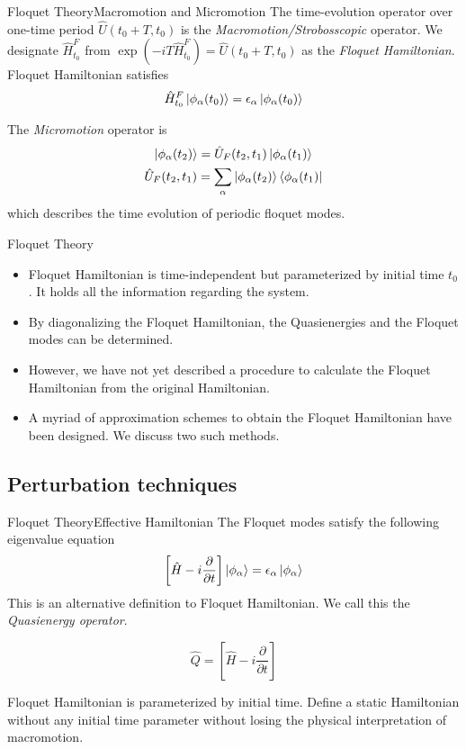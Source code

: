 \documentclass{beamer}
\begin{document}
\begin{frame}{Floquet Theory}{Macromotion and Micromotion}\small
The time-evolution operator over one-time period $\hat{U}(t_0 + T, t_0)$ is the \emph{Macromotion/Strobosscopic} operator.
We designate $\hat{H}_{t_0}^{F}$ from $\exp\left(-iT\hat{H}_{t_0}^{F}\right) = \hat{U}(t_0 + T, t_0)$ as the \emph{Floquet Hamiltonian}.
Floquet Hamiltonian satisfies
\begin{equation}
 \hat{H}_{t_0}^{F}\ket{\phi_\alpha (t_0)} = \epsilon_\alpha \ket{\phi_\alpha (t_0)}
\end{equation}

The \emph{Micromotion} operator is
\begin{gather}
  \ket{\phi_\alpha (t_2)} = \hat{U}_{F}(t_2, t_1)\ket{\phi_\alpha (t_1)}\\
  \hat{U}_{F}(t_2, t_1) = \sum_{\alpha}{\ket{\phi_\alpha (t_2)}\bra{\phi_\alpha (t_1)}}
\end{gather} which describes the time evolution of periodic floquet modes.
\normalsize \end{frame}

\begin{frame}{Floquet Theory}
\begin{itemize}
 \item Floquet Hamiltonian is time-independent but parameterized by initial time $t_0$. It holds all the information regarding the system.
 \item By diagonalizing the Floquet Hamiltonian, the Quasienergies and the Floquet modes can be determined.
 \item However, we have not yet described a procedure to calculate the Floquet Hamiltonian from the original Hamiltonian.
 \item A myriad of approximation schemes to obtain the Floquet Hamiltonian have been designed. We discuss two such methods.
\end{itemize}
\end{frame}

\subsection{Perturbation techniques}
\begin{frame}{Floquet Theory}{Effective Hamiltonian}
 The Floquet modes satisfy the following eigenvalue equation
  \begin{equation*}
    \left[\hat{H} - i\frac{\partial}{\partial t}\right]\ket{\phi_\alpha} = \epsilon_\alpha\ket{\phi_\alpha}
  \end{equation*} This is an alternative definition to Floquet Hamiltonian. We call this the \emph{Quasienergy operator}.
  
  \begin{equation}
   \hat{Q} = \left[\hat{H} - i\frac{\partial}{\partial t}\right]
  \end{equation}
  
  Floquet Hamiltonian is parameterized by initial time. Define a static Hamiltonian without any initial time parameter without losing the
  physical interpretation of macromotion.
\end{frame}
\end{document}
